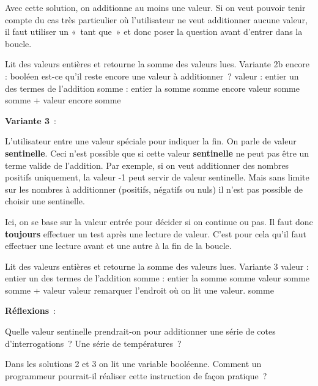 		Avec cette solution, on additionne au moins une valeur. 
		Si on veut pouvoir tenir compte du
		cas très particulier où l’utilisateur ne veut
		additionner aucune valeur, il faut utiliser un «~tant que~» et donc
		poser la question avant d’entrer dans la boucle.

		\begin{Pseudocode}
		\LComment Lit des valeurs entières et retourne la somme des valeurs lues.
		 \RComment Variante 2b
			\Decl encore : booléen \RComment est-ce qu’il reste encore une valeur à additionner~?
			\Decl valeur : entier \RComment un des termes de l’addition
			\Decl somme : entier \RComment la somme
			\Let somme 
			\Read encore
				\Read valeur
				\Let somme \Gets somme + valeur 
				\Read encore
			\EndWhile
			\Return somme
		\EndModule
		\end{Pseudocode}

		\medskip
		\textbf{Variante 3}~:
		
		L’utilisateur entre une valeur spéciale pour indiquer la fin. 
		On parle de valeur \textbf{sentinelle}. 
		Ceci n’est possible que si cette valeur \textbf{sentinelle} ne peut pas être
		un terme valide de l’addition. Par exemple, si on veut
		additionner des nombres positifs uniquement, la valeur -1 peut servir
		de valeur sentinelle. Mais sans limite sur les nombres à additionner
		(positifs, négatifs ou nuls) il n’est pas possible de
		choisir une sentinelle.

		Ici, on se base sur la valeur entrée pour décider si on continue ou pas. 
		Il faut donc \textbf{toujours} effectuer un test
		après une lecture de valeur. C’est pour cela
		qu’il faut effectuer une lecture avant et une autre à
		la fin de la boucle.

		\begin{Pseudocode}
		\LComment Lit des valeurs entières et retourne la somme des valeurs lues.
		 \RComment Variante 3
			\Decl valeur : entier \RComment un des termes de l’addition
			\Decl somme : entier \RComment la somme
			\Let somme \Gets 0
			\Read valeur
			\While{valeur ${\geq}$ 0} 
				\Let somme \Gets somme + valeur 
				\Read valeur \RComment remarquer l’endroit où on lit une valeur.
			\EndWhile
			\Return somme
		\EndModule
		\end{Pseudocode}

		\textbf{Réflexions}~: 
		\begin{liste}
		\item
			Quelle valeur sentinelle prendrait-on 
			pour additionner une série de cotes d’interrogations~? 
			Une série de températures~?
		\item
			Dans les solutions 2 et 3 on lit une variable booléenne. 
			Comment un programmeur pourrait-il réaliser 
			cette instruction de façon pratique~?		
		\end{liste}
		
